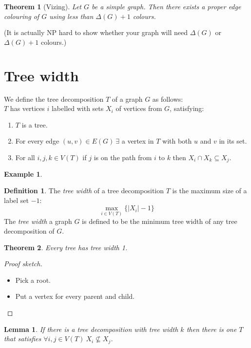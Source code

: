 \documentclass{article}
\newtheorem*{thm}{Theorem}
\newtheorem*{lem}{Lemma}
\theoremstyle{definition}
\newtheorem*{defn}{Definition}
\newtheorem*{ex}{Example}
\begin{document}
\begin{thm}[Vizing]
Let $G$ be a simple graph.
Then there exists a proper edge colouring of $G$ using less than $\Delta(G) + 1$ colours.
\end{thm}

(It is actually NP hard to show whether your graph will need $\Delta(G)$ or $\Delta(G) + 1$ colours.)



\section{Tree width}

We define the tree decomposition $T$ of a graph $G$ as follows: \\
$T$ has vertices $i$ labelled with sets $X_i$ of vertices from $G$, satisfying:
\begin{enumerate}
\item $T$ is a tree.
\item For every edge $(u,v)\in E(G)\ \exists$ a vertex in $T$ with both $u$ and $v$ in its set.
\item For all $i,j,k\in V(T)$ if $j$ is on the path from $i$ to $k$ then $X_i\cap X_k\subseteq X_j$.
\end{enumerate}

\begin{ex}
\end{ex}

\begin{defn}
The \emph{tree width} of a tree decomposition $T$ is the maximum size of a label set $- 1$:
$$\max_{i\in V(T)} \{|X_i| -1\}$$
The \emph{tree width} a graph $G$ is defined to be the minimum tree width of any tree decomposition of $G$.
\end{defn}

\begin{thm}
Every tree has tree width 1.
\end{thm}

\begin{proof}[Proof sketch]
\begin{itemize}
\item Pick a root.
\item Put a vertex for every parent and child.
\end{itemize}
\end{proof}

\begin{lem}
If there is a tree decomposition with tree width $k$ then there is one $T$ that satisfies $\forall i, j\in V(T)\ X_i\not\subseteq X_j$.
\end{lem}
\end{document}
